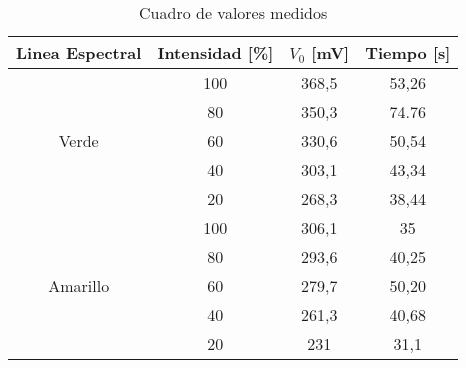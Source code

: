 \documentclass[a4paper,12pt]{report}
\begin{document}
    \begin{table}[htbp!]
        \centering
        \begin{tabular}{|c|c|c|c|}
        \hline
        Linea Espectral & Intensidad [\%] & $V_0$ [mV]& Tiempo [s]\\
        \hline
        \multirow{5}{*}{Verde} & 100 & 368,5 & 53,26 \\
                                \cline{2-4}
                                &  80 & 350,3 & 74.76 \\
                                \cline{2-4}
                                &  60 & 330,6 & 50,54 \\
                                \cline{2-4}
                                &  40 & 303,1 & 43,34 \\
                                \cline{2-4}
                                &  20 & 268,3 & 38,44 \\
        \hline
        \multirow{5}{*}{Amarillo} & 100 & 306,1 & 35 \\
                                \cline{2-4}
                                  &  80 & 293,6 & 40,25 \\
                                \cline{2-4}
                                  &  60 & 279,7 & 50,20 \\
                                \cline{2-4}
                                  &  40 & 261,3 & 40,68 \\
                                \cline{2-4}
                                  &  20 & 231 & 31,1 \\
        \hline
        \end{tabular}
        \caption{Cuadro de valores medidos}
        \label{tab:datos experiencia 1}
    \end{table}
\end{document}

